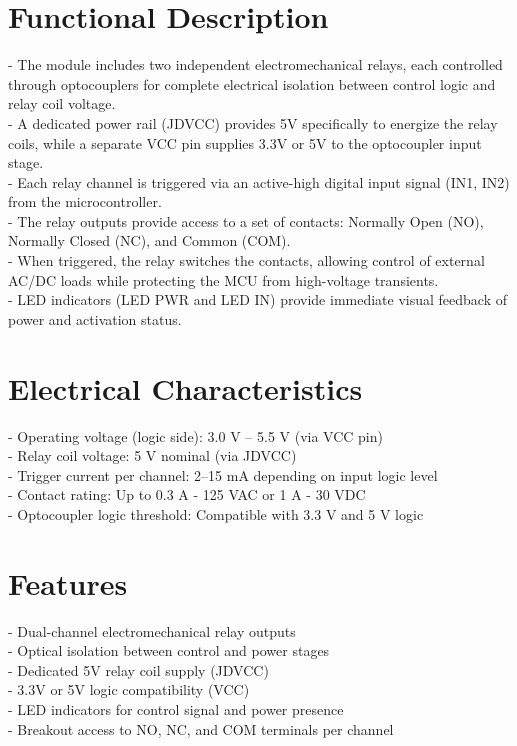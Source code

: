 \documentclass[10pt]{article}
\begin{document}
\section*{Functional Description}
- The module includes two independent electromechanical relays, each controlled through optocouplers for complete electrical isolation between control logic and relay coil voltage.\\ 
- A dedicated power rail (JDVCC) provides 5V specifically to energize the relay coils, while a separate VCC pin supplies 3.3V or 5V to the optocoupler input stage.\\ 
- Each relay channel is triggered via an active-high digital input signal (IN1, IN2) from the microcontroller.\\ 
- The relay outputs provide access to a set of contacts: Normally Open (NO), Normally Closed (NC), and Common (COM).\\ 
- When triggered, the relay switches the contacts, allowing control of external AC/DC loads while protecting the MCU from high-voltage transients.\\ 
- LED indicators (LED PWR and LED IN) provide immediate visual feedback of power and activation status.\\ 

\section*{Electrical Characteristics}
- Operating voltage (logic side): 3.0 V – 5.5 V (via VCC pin)\\ 
- Relay coil voltage: 5 V nominal (via JDVCC)\\ 
- Trigger current per channel: 2–15 mA depending on input logic level\\ 
- Contact rating: Up to 0.3 A - 125 VAC or 1 A - 30 VDC\\ 
- Optocoupler logic threshold: Compatible with 3.3 V and 5 V logic\\ 

\section*{Features}
- Dual-channel electromechanical relay outputs\\ 
- Optical isolation between control and power stages\\ 
- Dedicated 5V relay coil supply (JDVCC)\\ 
- 3.3V or 5V logic compatibility (VCC)\\ 
- LED indicators for control signal and power presence\\ 
- Breakout access to NO, NC, and COM terminals per channel\\ 
\end{document}
